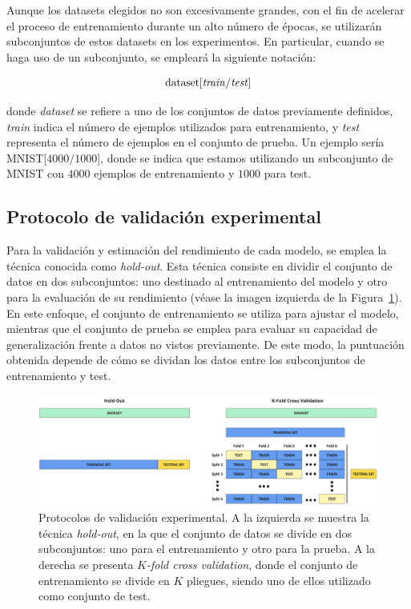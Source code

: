 Aunque los datasets elegidos no son excesivamente grandes, con el fin de acelerar el proceso de entrenamiento durante un alto número de épocas, se utilizarán subconjuntos de estos datasets en los experimentos. En particular, cuando se haga uso de un subconjunto, se empleará la siguiente notación:

\[
    \text{dataset}[\text{\textit{train}/\textit{test}}]
\]

donde \textit{dataset} se refiere a uno de los conjuntos de datos previamente definidos, \textit{train} indica el número de ejemplos utilizados para entrenamiento, y \textit{test} representa el número de ejemplos en el conjunto de prueba. Un ejemplo sería MNIST[$4000/1000$], donde se indica que estamos utilizando un subconjunto de MNIST con $4000$ ejemplos de entrenamiento y $1000$ para test.\newline

\subsection{Protocolo de validación experimental}\label{subsec:protocolo-experimental}

Para la validación y estimación del rendimiento de cada modelo, se emplea la técnica conocida como \textit{hold-out}. Esta técnica consiste en dividir el conjunto de datos en dos subconjuntos: uno destinado al entrenamiento del modelo y otro para la evaluación de su rendimiento (véase la imagen izquierda de la Figura~\ref{fig:protocolos}). En este enfoque, el conjunto de entrenamiento se utiliza para ajustar el modelo, mientras que el conjunto de prueba se emplea para evaluar su capacidad de generalización frente a datos no vistos previamente. De este modo, la puntuación obtenida depende de cómo se dividan los datos entre los subconjuntos de entrenamiento y test.\newline

\begin{figure}[h]
    \centering
    \includegraphics[width=0.8\linewidth]{img/protocolo-experimental.png}
    \caption[Protocolos de validación experimental.]{Protocolos de validación experimental. A la izquierda se muestra la técnica \textit{hold-out}, en la que el conjunto de datos se divide en dos subconjuntos: uno para el entrenamiento y otro para la prueba. A la derecha se presenta \textit{$K$-fold cross validation}, donde el conjunto de entrenamiento se divide en $K$ pliegues, siendo uno de ellos utilizado como conjunto de test.}\label{fig:protocolos}
\end{figure}

